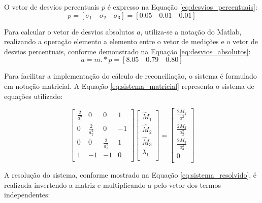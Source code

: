 O vetor de desvios percentuais \(p\) é expresso na Equação \eqref{eq:desvios_percentuais}:
\begin{equation}
    p = [\sigma_1 \quad \sigma_2 \quad \sigma_3] = [0.05 \quad 0.01 \quad 0.01]
    \label{eq:desvios_percentuais}
\end{equation}

Para calcular o vetor de desvios absolutos \(a\), utiliza-se a notação do Matlab, realizando a operação elemento a elemento entre o vetor de medições e o vetor de desvios percentuais, conforme demonstrado na Equação \eqref{eq:desvios_absolutos}:
\begin{equation}
    a = m .* p = [8.05 \quad 0.79 \quad 0.80]
    \label{eq:desvios_absolutos}
\end{equation}

Para facilitar a implementação do cálculo de reconciliação, o sistema é formulado em notação matricial. A Equação \eqref{eq:sistema_matricial} representa o sistema de equações utilizado:

\begin{equation}
\begin{bmatrix}
    \frac{2}{a_1^2} & 0 & 0 & 1 \\
    0 & \frac{2}{a_2^2} & 0 & -1 \\
    0 & 0 & \frac{2}{a_3^2} & 1 \\
    1 & -1 & -1 & 0 \\
\end{bmatrix}
\begin{bmatrix}
    \hat{M}_1 \\
    \hat{M}_2 \\
    \hat{M}_3 \\
    \lambda_1 \\
\end{bmatrix}
=
\begin{bmatrix}
    \frac{2 M_1}{a_1^2} \\
    \frac{2 M_2}{a_2^2} \\
    \frac{2 M_3}{a_3^2} \\
    0 \\
\end{bmatrix}
\label{eq:sistema_matricial}
\end{equation}

A resolução do sistema, conforme mostrado na Equação \eqref{eq:sistema_resolvido}, é realizada invertendo a matriz e multiplicando-a pelo vetor dos termos independentes:

